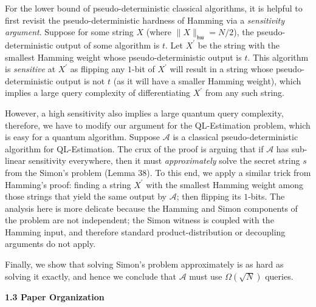 \documentclass[10pt,a4paper]{article}
\begin{document}
For the lower bound of pseudo-deterministic classical algorithms,
it is helpful to first revisit the pseudo-deterministic hardness of Hamming via a \emph{sensitivity argument}. Suppose for some string $X$ (where $\|X\|_{\mathsf{hw}}=N/2$), the pseudo-deterministic output of some algorithm is $t$. Let $X^{\prime}$ be the string with the smallest Hamming weight whose pseudo-deterministic output is $t$. This algorithm is \emph{sensitive} at $X^{\prime}$ as flipping any $1$-bit of $X^{\prime}$ will result in a string whose pseudo-deterministic output is not $t$ (as it will have a smaller Hamming weight), which implies a large query complexity of differentiating $X^{\prime}$ from any such string.\par




However, a high sensitivity also implies a large quantum query complexity, therefore, we have to modify our argument for the QL-Estimation problem, which is easy for a quantum algorithm. Suppose $\mathcal{A}$ is a classical pseudo-deterministic algorithm for QL-Estimation. The crux of the proof is arguing that if $\mathcal{A}$ has sub-linear sensitivity everywhere, then it must \emph{approximately} solve the secret string $s$ from the Simon’s problem (Lemma 38).
To this end, we apply a similar trick from Hamming’s proof: finding a string $X^{\prime}$ with the smallest Hamming weight among those strings that yield the same output by $\mathcal{A}$; then flipping its $1$-bits. The analysis here is more delicate because the Hamming and Simon components of the problem are not independent; the Simon witness is coupled with the Hamming input, and therefore standard product-distribution or decoupling arguments do not apply.\par




Finally, we show that solving Simon’s problem approximately is as hard as solving it exactly, and hence we conclude that $\mathcal{A}$ must use $\Omega(\sqrt{N})$ queries.\par






\par\medskip\noindent\textbf{
1.3 Paper Organization}\par
\end{document}
